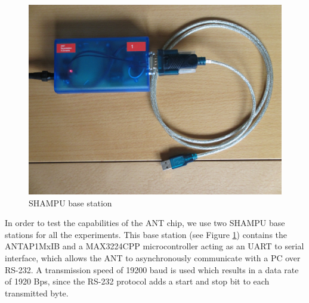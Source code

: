 \begin{figure}[H]
	\centering
	\includegraphics[scale=.5]{content/images/SHAMPUbase.JPG}
	\caption{SHAMPU base station}\label{fig:shampubase}
\end{figure}
In order to test the capabilities of the ANT chip, we use two SHAMPU base stations for all the experiments. This base station (see Figure \ref{fig:shampubase}) contains the ANTAP1MxIB and a MAX3224CPP microcontroller acting as an UART to serial interface, which allows the ANT to asynchronously communicate with a PC over RS-232. A transmission speed of 19200 baud is used which results in a data rate of 1920 Bps, since the RS-232 protocol adds a start and stop bit to each transmitted byte.
